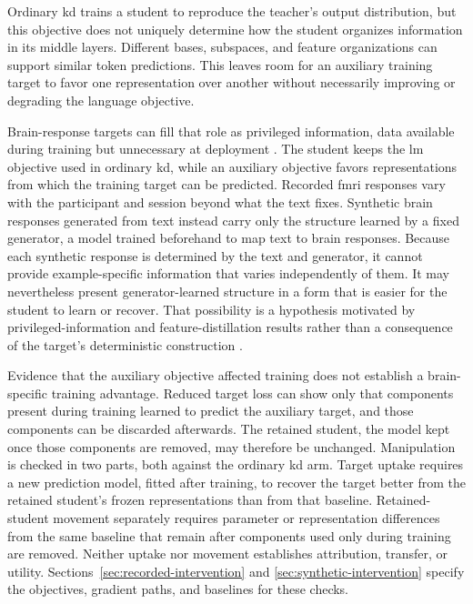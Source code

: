 Ordinary \ac{kd} trains a student to reproduce the teacher's output distribution, but this objective does not uniquely determine how the student organizes information in its middle layers.
Different bases, subspaces, and feature organizations can support similar token predictions.
This leaves room for an auxiliary training target to favor one representation over another without necessarily improving or degrading the language objective.

Brain-response targets can fill that role as privileged information, data available during training but unnecessary at deployment \autocite{lopezpaz2016}.
The student keeps the \ac{lm} objective used in ordinary \ac{kd}, while an auxiliary objective favors representations from which the training target can be predicted.
Recorded \ac{fmri} responses vary with the participant and session beyond what the text fixes.
Synthetic brain responses generated from text instead carry only the structure learned by a fixed generator, a model trained beforehand to map text to brain responses.
Because each synthetic response is determined by the text and generator, it cannot provide example-specific information that varies independently of them.
It may nevertheless present generator-learned structure in a form that is easier for the student to learn or recover.
That possibility is a hypothesis motivated by privileged-information and feature-distillation results rather than a consequence of the target's deterministic construction \autocite{lopezpaz2016,saadi2025}.

Evidence that the auxiliary objective affected training does not establish a brain-specific training advantage.
Reduced target loss can show only that components present during training learned to predict the auxiliary target, and those components can be discarded afterwards.
The retained student, the model kept once those components are removed, may therefore be unchanged.
Manipulation is checked in two parts, both against the ordinary \ac{kd} arm.
Target uptake requires a new prediction model, fitted after training, to recover the target better from the retained student's frozen representations than from that baseline.
Retained-student movement separately requires parameter or representation differences from the same baseline that remain after components used only during training are removed.
Neither uptake nor movement establishes attribution, transfer, or utility.
Sections~\ref{sec:recorded-intervention} and \ref{sec:synthetic-intervention} specify the objectives, gradient paths, and baselines for these checks.


